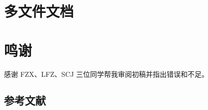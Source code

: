 \documentclass{ctexart}
\begin{document}
\section{多文件文档}


\section*{鸣谢}
感谢 FZX、LFZ、SCJ 三位同学帮我审阅初稿并指出错误和不足。

\listoftables
\listoffigures
\lstlistoflistings
{}\label{lstof:exercises}

\subsection*{参考文献}
\printbibliography[heading=none]
\end{document}
